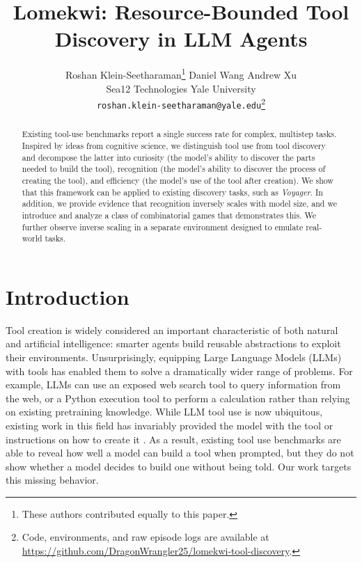 \documentclass{article}
\title{Lomekwi: Resource-Bounded Tool Discovery in LLM Agents}
\author{%
Roshan Klein-Seetharaman\thanks{These authors contributed equally to this paper.} \quad
Daniel Wang\footnotemark[1] \quad
Andrew Xu\footnotemark[1] \\
Sea12 Technologies \quad Yale University \\
\texttt{roshan.klein-seetharaman@yale.edu}\thanks{Code, environments, and raw episode logs are available at \protect\url{https://github.com/DragonWrangler25/lomekwi-tool-discovery}.}}
\begin{document}
\maketitle

\begin{abstract}
Existing tool-use benchmarks report a single success rate for complex, multistep tasks. Inspired by ideas from cognitive science, we distinguish tool use from tool discovery and decompose the latter into curiosity (the model’s ability to discover the parts needed to build the tool), recognition (the model’s ability to discover the process of creating the tool), and efficiency (the model’s use of the tool after creation). We show that this framework can be applied to existing discovery tasks, such as \textit{Voyager}. In addition, we provide evidence that recognition inversely scales with model size, and we introduce and analyze a class of combinatorial games that demonstrates this. We further observe inverse scaling in a separate environment designed to emulate real-world tasks.

\end{abstract}

\section{Introduction}
\label{sec:intro}
Tool creation is widely considered an important characteristic of both natural and artificial intelligence: smarter agents build reusable abstractions to exploit their environments. Unsurprisingly, equipping Large Language Models (LLMs) with tools has enabled them to solve a dramatically wider range of problems. For example, LLMs can use an exposed web search tool to query information from the web, or a Python execution tool to perform a calculation rather than relying on existing pretraining knowledge. While LLM tool use is now ubiquitous, existing work in this field has invariably provided the model with the tool \citep{yu2026wildtoolbench} or instructions on how to create it \citep{cai2024latm}. As a result, existing tool use benchmarks are able to reveal how well a model can build a tool when prompted, but they do not show whether a model decides to build one without being told. Our work targets this missing behavior. 
\end{document}
